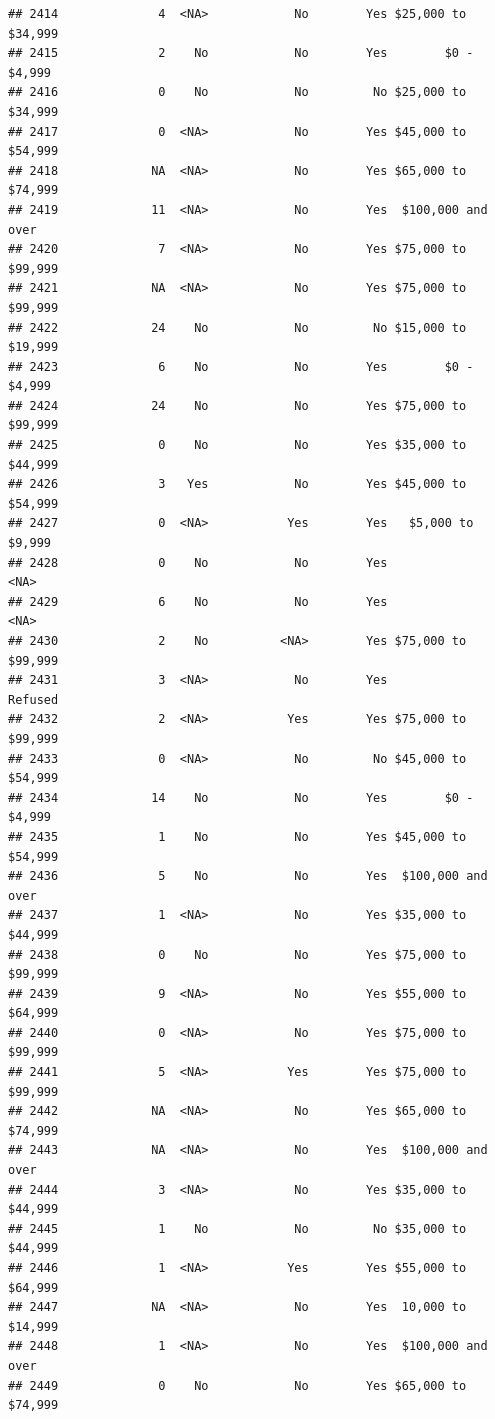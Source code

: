 \documentclass[man]{apa6}
\begin{document}
\begin{verbatim}
## 2414              4  <NA>            No        Yes $25,000 to $34,999
## 2415              2    No            No        Yes        $0 - $4,999
## 2416              0    No            No         No $25,000 to $34,999
## 2417              0  <NA>            No        Yes $45,000 to $54,999
## 2418             NA  <NA>            No        Yes $65,000 to $74,999
## 2419             11  <NA>            No        Yes  $100,000 and over
## 2420              7  <NA>            No        Yes $75,000 to $99,999
## 2421             NA  <NA>            No        Yes $75,000 to $99,999
## 2422             24    No            No         No $15,000 to $19,999
## 2423              6    No            No        Yes        $0 - $4,999
## 2424             24    No            No        Yes $75,000 to $99,999
## 2425              0    No            No        Yes $35,000 to $44,999
## 2426              3   Yes            No        Yes $45,000 to $54,999
## 2427              0  <NA>           Yes        Yes   $5,000 to $9,999
## 2428              0    No            No        Yes               <NA>
## 2429              6    No            No        Yes               <NA>
## 2430              2    No          <NA>        Yes $75,000 to $99,999
## 2431              3  <NA>            No        Yes            Refused
## 2432              2  <NA>           Yes        Yes $75,000 to $99,999
## 2433              0  <NA>            No         No $45,000 to $54,999
## 2434             14    No            No        Yes        $0 - $4,999
## 2435              1    No            No        Yes $45,000 to $54,999
## 2436              5    No            No        Yes  $100,000 and over
## 2437              1  <NA>            No        Yes $35,000 to $44,999
## 2438              0    No            No        Yes $75,000 to $99,999
## 2439              9  <NA>            No        Yes $55,000 to $64,999
## 2440              0  <NA>            No        Yes $75,000 to $99,999
## 2441              5  <NA>           Yes        Yes $75,000 to $99,999
## 2442             NA  <NA>            No        Yes $65,000 to $74,999
## 2443             NA  <NA>            No        Yes  $100,000 and over
## 2444              3  <NA>            No        Yes $35,000 to $44,999
## 2445              1    No            No         No $35,000 to $44,999
## 2446              1  <NA>           Yes        Yes $55,000 to $64,999
## 2447             NA  <NA>            No        Yes  10,000 to $14,999
## 2448              1  <NA>            No        Yes  $100,000 and over
## 2449              0    No            No        Yes $65,000 to $74,999

\end{verbatim}
\end{document}
